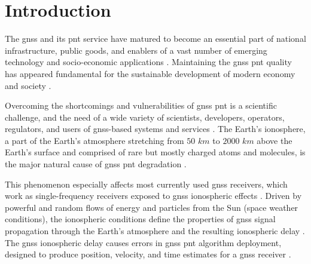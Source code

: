 \documentclass[sn-mathphys-num]{sn-jnl}%
\begin{document}



\maketitle

\section{Introduction}

The \acrfull{gnss} and its \acrfull{pnt} service have matured to become an essential part of national infrastructure, public goods, and enablers of a vast number of emerging technology and socio-economic applications \cite{filjar2022application}. Maintaining the \acrshort{gnss} \acrshort{pnt} quality has appeared fundamental for the sustainable development of modern economy and society \cite{filjar2022application}. 

Overcoming the shortcomings and vulnerabilities of \acrshort{gnss} \acrshort{pnt} is a scientific challenge, and the need of a wide variety of scientists, developers, operators, regulators, and users of \acrshort{gnss}-based systems and services \cite{filjar2024ambient, filjar2022application}. The Earth’s ionosphere, a part of the Earth’s atmosphere stretching from $50$ $km$ to $2000$ $km$ above the Earth’s surface and comprised of rare but mostly charged atoms and molecules, is the major natural cause of \acrshort{gnss} \acrshort{pnt} degradation \cite{davies1990ionospheric, filic2018modelling}. 

This phenomenon especially affects most currently used \acrshort{gnss} receivers, which work as single-frequency receivers exposed to \acrshort{gnss} ionospheric effects \cite{spilker1996global, filjar2022application}. Driven by powerful and random flows of energy and particles from the Sun (space weather conditions), the ionospheric conditions define the properties of \acrshort{gnss} signal propagation through the Earth’s atmosphere and the resulting ionospheric delay \cite{davies1990ionospheric, oxley2017uncertainties, filic2018modelling}. The \acrshort{gnss} ionospheric delay causes errors in \acrshort{gnss} \acrshort{pnt} algorithm deployment, designed to produce position, velocity, and time estimates for a \acrshort{gnss} receiver \cite{spilker1996global, filic2018modelling}. 
\end{document}
